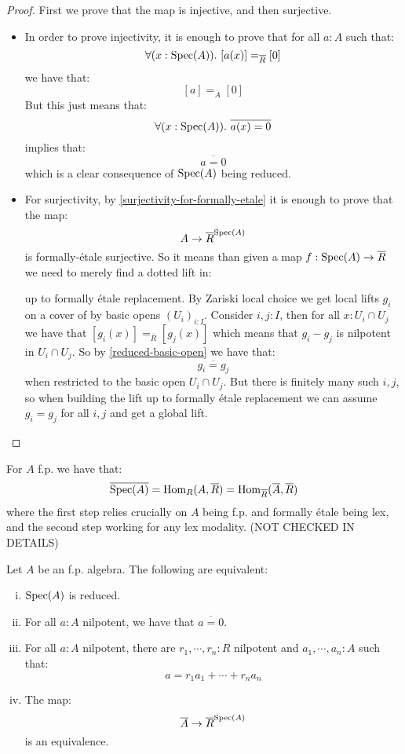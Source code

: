 \begin{proof}
First we prove that the map is injective, and then surjective.
\begin{itemize}

\item In order to prove injectivity, it is enough to prove that for all $a:A$ such that:
\[\forall (x:\operatorname{Spec}(A)).\ [a(x)] =_{\overline{R}} [0]\]
we have that:
\[[a] =_{\overline{A}} [0]\]
But this just means that:
\[\forall (x:\operatorname{Spec}(A)).\ \overline{a(x)=0}\]
implies that:
\[\overline{a=0}\]
which is a clear consequence of $\operatorname{Spec}(A)$ being reduced.

\item For surjectivity, by \cref{surjectivity-for-formally-etale} it is enough to prove that the map:
\[A\to \overline{R}^{\operatorname{Spec}(A)}\]
is formally-étale surjective. So it means than given a map $f: \operatorname{Spec}(A)\to \overline{R}$ we need to merely find a dotted lift in:
 \begin{center}
    \end{center}
up to formally étale replacement. By Zariski local choice we get local lifts $g_i$ on a cover of by basic opens $(U_i)_{i:I}$. Consider $i,j:I$, then for all $x:U_i\cap U_j$ we have that $[g_i(x)] =_{\overline{R}} [g_j(x)]$ which means that $g_i-g_j$ is nilpotent in $U_i\cap U_j$. So by \cref{reduced-basic-open} we have that:
\[\overline{g_i = g_j}\]
when restricted to the basic open $U_i\cap U_j$. But there is finitely many such $i,j$, so when building the lift up to formally étale replacement we can assume $g_i = g_j$ for all $i,j$ and get a global lift.
\end{itemize}
\end{proof}

\begin{remark}
For $A$ f.p. we have that:
\[\overline{\operatorname{Spec}(A)} = \mathrm{Hom}_{R}(A,\overline{R}) = \mathrm{Hom}_{\overline{R}}(\overline{A},\overline{R})\]
where the first step relies crucially on $A$ being f.p. and formally étale being lex, and the second step working for any lex modality. (NOT CHECKED IN DETAILS)
\end{remark}

\begin{theorem}\label{reduced-affine}
Let $A$ be an f.p. algebra. The following are equivalent:
\begin{enumerate}[(i)]
\item $\operatorname{Spec}(A)$ is reduced.
\item For all $a:A$ nilpotent, we have that $\overline{a=0}$.
\item For all $a:A$ nilpotent, there are $r_1,\cdots,r_n:R$ nilpotent and $a_1,\cdots,a_n:A$ such that:
\[a = r_1a_1+\cdots+r_na_n\]
\item The map:
\[\overline{A}\to \overline{R}^{\operatorname{Spec}(A)}\]
is an equivalence.
\end{enumerate}
\end{theorem}

